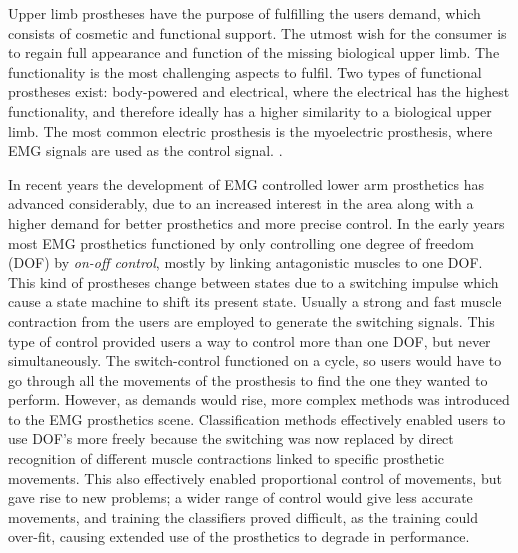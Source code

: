 
Upper limb prostheses have the purpose of fulfilling the users demand, which consists of cosmetic and functional support. The utmost wish for the consumer is to regain full appearance and function of the missing biological upper limb. The functionality is the most challenging aspects to fulfil. Two types of functional prostheses exist: body-powered and electrical, where the electrical has the highest functionality, and therefore ideally has a higher similarity to a biological upper limb. The most common electric prosthesis is the myoelectric prosthesis, where EMG signals are used as the control signal. \cite{jiang2012}. 

In recent years the development of EMG controlled lower arm prosthetics has advanced considerably, due to an increased interest in the area along with a higher demand for better prosthetics and more precise control. \cite{Fougner2012} In the early years most EMG prosthetics functioned by only controlling one degree of freedom (DOF) by \textit{on-off control}, mostly by linking antagonistic muscles to one DOF. This kind of prostheses change between states due to a switching impulse which cause a state machine to shift its present state. Usually a strong and fast muscle contraction from the users are employed to generate the switching signals. \cite{amsuess2014}
This type of control provided users a way to control more than one DOF, but never simultaneously. The switch-control functioned on a cycle, so users would have to go through all the movements of the prosthesis to find the one they wanted to perform. However, as demands would rise, more complex methods was introduced to the EMG prosthetics scene. Classification methods effectively enabled users to use DOF's more freely because the switching was now replaced by direct recognition of different muscle contractions linked to specific prosthetic movements. This also effectively enabled proportional control of movements, but gave rise to new problems; a wider range of control would give less accurate movements, and training the classifiers proved difficult, as the training could over-fit, causing extended use of the prosthetics to degrade in performance. \cite{Ison2016}

